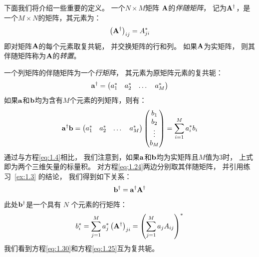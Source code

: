 下面我们将介绍一些重要的定义。
一个$N\times M$矩阵 $\mathbf A$的\emph{伴随矩阵}，
记为$\mathbf{A}^\dagger$，是一个$M \times N$的矩阵，其元素为：
\begin{equation}
 \left(\mathbf{A}^\dagger\right)_{ij} = A_{ji}^{\ast}
 \label{eq:1.26}
\end{equation}
即对矩阵$\mathbf A$的每个元素取复共轭，
并交换矩阵的行和列。
如果$\mathbf A$为实矩阵，
则其伴随矩阵称为$\mathbf A$的\emph{转置}。


一个列矩阵的伴随矩阵为一个\emph{行矩阵}，
其元素为原矩阵元素的复共轭：
\begin{equation}
 {\mbf a}^{\dagger} = 
 \begin{pmatrix*}[c]
     a_1^\ast & a_2^\ast &\dots &a_M^\ast
 \end{pmatrix*}
 \label{eq:1.27}
\end{equation}
如果${\mathbf a}$和$\mathbf b$均为含有$M$个元素的列矩阵，则有：
\begin{equation}
 {\mbf a}^{\dagger}{\mbf b} = 
 \begin{pmatrix*}[c]
     a_1^\ast & a_2^\ast &\dots &a_M^\ast
 \end{pmatrix*}
 \begin{pmatrix*}[c]
     b_1 \\ b_2 \\ \vdots \\ b_M
 \end{pmatrix*}
     = \sum_{i=1}^M a_i^{\ast} b_i
 \label{eq:1.28}
\end{equation}
通过与方程\eqref{eq:1.4}相比，
我们注意到，如果$\mathbf a$和$\mathbf b$均为实矩阵且$M$值为3时，
上式即为两个三维矢量的标量积。
对方程\eqref{eq:1.24}两边分别取其伴随矩阵，
并引用练习~\ref{ex:1.3} 的结论，
我们得到如下关系：
\begin{equation}
 {\mathbf b}^\dagger = {\mathbf a}^\dagger {\mathbf A}^\dagger
\end{equation}
此处$\mathbf b^\dagger$是一个具有 $N$ 个元素的行矩阵：
\begin{equation}
 b_i^\ast = \sum_{j=1}^M a_j^\ast \left(\mathbf A^\dagger\right)_{ji} = \left(
     \sum_{j=1}^M a_j A_{ij}
 \right)^\ast
 \label{eq:1.30}
\end{equation}
我们看到方程\eqref{eq:1.30}和方程\eqref{eq:1.25}互为复共轭。

